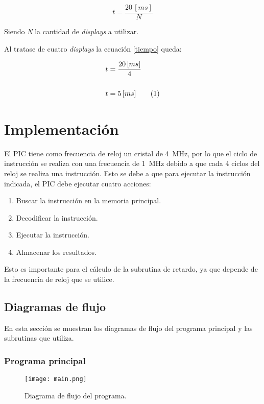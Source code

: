 \documentclass[12pt,a4paper]{article}
\newcommand\numberthis{\addtocounter{equation}{1}\tag{\theequation}}
\begin{document}
	\begin{equation}
	t = \frac{20\,[ms]}{N}
	\label{tiempo}
	\end{equation}
	
	 Siendo \emph{N} la cantidad de \emph{displays} a utilizar.
	 
	 Al tratase de cuatro \emph{displays} la ecuación \ref{tiempo} queda:
	 
	 \begin{align*}
	 t &= \frac{20\,[ms]}{4}\\
	 \\t &= 5\,[ms] \numberthis
	 \end{align*}

	 
\section{Implementación}
	El PIC tiene como frecuencia de reloj un cristal de \SI{4}{\MHz}, por lo que el ciclo de instrucción se realiza con una frecuencia de \SI{1}{\MHz} debido a que cada 4 ciclos del reloj se realiza una instrucción. Esto se debe a que para ejecutar la instrucción indicada, el PIC debe ejecutar cuatro acciones: 
	
	\begin{enumerate}[leftmargin=1.5cm,nosep]
	\item Buscar la instrucción en la memoria principal.
	\item Decodificar la instrucción.
	\item Ejecutar la instrucción.
	\item Almacenar los resultados.
	\end{enumerate}
	
	Esto es importante para el cálculo de la subrutina de retardo, ya que depende de la frecuencia de reloj que se utilice.

\subsection{Diagramas de flujo}
	En esta sección se muestran los diagramas de flujo del programa principal y las subrutinas que utiliza.
	
	\subsubsection{Programa principal}	
	
	\begin{figure}[H]
	\texttt{[image: main.png]}
	\centering
	\caption{Diagrama de flujo del programa.}
	\end{figure}		
	
\end{document}

